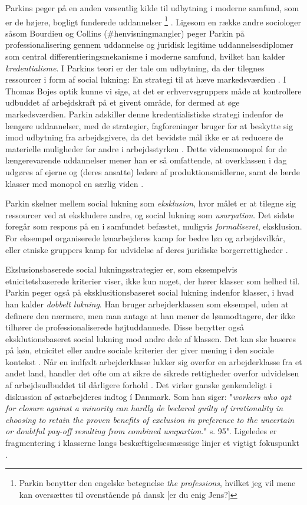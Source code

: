 Parkins peger på en anden væsentlig kilde til udbytning i moderne samfund, som er de højere, bogligt funderede uddannelser%
%
\footnote{Parkin benytter den engelske betegnelse \emph{the professions}, hvilket jeg vil mene kan oversættes til ovenstående på dansk [er du enig Jens?]}%
%
. Ligesom en række andre sociologer såsom Bourdieu og Collins (\#henvisningmangler) peger Parkin på professionalisering gennem uddannelse og juridisk legitime uddannelsesdiplomer som central differentieringsmekanisme i moderne samfund, hvilket han kalder \emph{kredentialisme}. I Parkins teori er der tale om udbytning, da der tilegnes ressourcer i form af social lukning: En strategi til at hæve markedsværdien \parencite[54]{Parkin1979}. I Thomas Bojes optik kunne vi sige, at det er erhvervsgruppers måde at kontrollere udbuddet af arbejdskraft på et givent område, for dermed at øge markedsværdien. Parkin adskiller denne kredentialistiske strategi indenfor de længere uddannelser, med de strategier, fagforeninger bruger for at beskytte sig imod udbytning fra arbejdsgivere, da det bevidste mål ikke er at reducere de materielle muligheder for andre i arbejdsstyrken \parencite[57]{Parkin1979}. Dette vidensmonopol for de længerevarende uddannelser mener han er så omfattende, at overklassen i dag udgøres af ejerne og (deres ansatte) ledere af produktionsmidlerne, samt de lærde klasser med monopol en særlig viden \parencite[58]{Parkin1979}. 

Parkin skelner mellem social lukning som \emph{eksklusion}, hvor målet er at tilegne sig ressourcer ved at ekskludere andre, og social lukning som \emph{usurpation}. Det sidste foregår som respons på en i samfundet befæstet, muligvis \emph{formaliseret}, eksklusion. For eksempel organiserede lønarbejderes kamp for bedre løn og arbejdsvilkår, eller etniske gruppers kamp for udvidelse af deres juridiske borgerrettigheder \parencite[74]{Parkin1979}. 

Ekslusionsbaserede social lukningsstrategier er, som eksempelvis etnicitetsbaserede kriterier viser, ikke kun noget, der hører klasser som helhed til. Parkin peger også på eksklusitionsbaseret social lukning indenfor klasser, i hvad han kalder \emph{dobbelt lukning}. Han bruger arbejderklassen som eksempel, uden at definere den nærmere, men man antage at han mener de lønmodtagere, der ikke tilhører de professionaliserede højtuddannede. Disse benytter også eksklutionsbaseret social lukning mod andre dele af klassen. Det kan ske baseres på køn, etnicitet eller andre sociale kriterier der giver mening i den sociale kontekst \parencite[89]{Parkin1979}. Når en indfødt arbejderklasse lukker sig overfor en arbejderklasse fra et andet land, handler det ofte om at sikre de sikrede rettigheder overfor udvidelsen af arbejdsudbuddet til dårligere forhold \parencite[91]{Parkin1979}. Det virker ganske genkendeligt i diskussion af østarbejderes indtog í Danmark. Som han siger: "\emph{workers who opt for closure against a minority can hardly de beclared guilty of irrationality in choosing to retain the proven benefits of exclusion in preference to the uncertain or doubtful pay-off resulting from combined usupartion.}" s. 95". Ligeledes er fragmentering i klasserne langs beskæftigelsesmæssige linjer et vigtigt fokuspunkt \parencite[81]{Parkin1979}.

